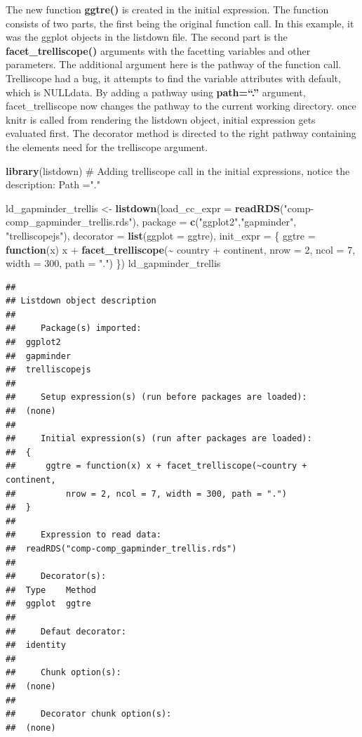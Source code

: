 \documentclass[
]{article}
\newenvironment{Shaded}{\begin{snugshade}}{\end{snugshade}}
\newcommand{\CommentTok}[1]{\textcolor[rgb]{0.54,0.53,0.53}{#1}}
\newcommand{\ControlFlowTok}[1]{\textcolor[rgb]{0.12,0.11,0.11}{\textbf{#1}}}
\newcommand{\DataTypeTok}[1]{\textcolor[rgb]{0.00,0.34,0.68}{#1}}
\newcommand{\DecValTok}[1]{\textcolor[rgb]{0.69,0.50,0.00}{#1}}
\newcommand{\KeywordTok}[1]{\textcolor[rgb]{0.12,0.11,0.11}{\textbf{#1}}}
\newcommand{\NormalTok}[1]{\textcolor[rgb]{0.12,0.11,0.11}{#1}}
\newcommand{\OperatorTok}[1]{\textcolor[rgb]{0.12,0.11,0.11}{#1}}
\newcommand{\StringTok}[1]{\textcolor[rgb]{0.75,0.01,0.01}{#1}}
\begin{document}
The new function \textbf{ggtre()} is created in the initial expression.
The function consists of two parts, the first being the original
function call. In this example, it was the ggplot objects in the
listdown file. The second part is the \textbf{facet\_trelliscope()}
arguments with the facetting variables and other parameters. The
additional argument here is the pathway of the function call.
Trelliscope had a bug, it attempts to find the variable attributes with
default, which is NULLdata. By adding a pathway using
\textbf{path=``.''} argument, facet\_trelliscope now changes the pathway
to the current working directory. once knitr is called from rendering
the listdown object, initial expression gets evaluated first. The
decorator method is directed to the right pathway containing the
elements need for the trelliscope argument.

\begin{Shaded}
\begin{Highlighting}[]
\KeywordTok{library}\NormalTok{(listdown)}
\CommentTok{\# Adding trelliscope call in the initial expressions, notice the description: Path ="."}

\NormalTok{ld\_gapminder\_trellis \textless{}{-}}
\StringTok{  }\KeywordTok{listdown}\NormalTok{(}\DataTypeTok{load\_cc\_expr =} \KeywordTok{readRDS}\NormalTok{(}\StringTok{"comp{-}comp\_gapminder\_trellis.rds"}\NormalTok{),}
                \DataTypeTok{package =} \KeywordTok{c}\NormalTok{(}\StringTok{"ggplot2"}\NormalTok{,}\StringTok{"gapminder"}\NormalTok{, }\StringTok{"trelliscopejs"}\NormalTok{),}
              \DataTypeTok{decorator =} \KeywordTok{list}\NormalTok{(}\DataTypeTok{ggplot =}\NormalTok{ ggtre), }
              \DataTypeTok{init\_expr =}\NormalTok{ \{}
\NormalTok{                  ggtre =}\StringTok{ }\ControlFlowTok{function}\NormalTok{(x) x }\OperatorTok{+}
\StringTok{                          }\KeywordTok{facet\_trelliscope}\NormalTok{(}\OperatorTok{\textasciitilde{}}\StringTok{ }\NormalTok{country }\OperatorTok{+}\StringTok{ }\NormalTok{continent,}
                                            \DataTypeTok{nrow =} \DecValTok{2}\NormalTok{, }\DataTypeTok{ncol =} \DecValTok{7}\NormalTok{, }\DataTypeTok{width =} \DecValTok{300}\NormalTok{, }\DataTypeTok{path =} \StringTok{"."}\NormalTok{)}
\NormalTok{                          \})}
\NormalTok{ld\_gapminder\_trellis}
\end{Highlighting}
\end{Shaded}

\begin{verbatim}
## 
## Listdown object description
## 
##     Package(s) imported:
##  ggplot2
##  gapminder
##  trelliscopejs
## 
##     Setup expression(s) (run before packages are loaded):
##  (none)
## 
##     Initial expression(s) (run after packages are loaded):
##  {
##      ggtre = function(x) x + facet_trelliscope(~country + continent, 
##          nrow = 2, ncol = 7, width = 300, path = ".")
##  }
## 
##     Expression to read data:
##  readRDS("comp-comp_gapminder_trellis.rds")
## 
##     Decorator(s):
##  Type    Method
##  ggplot  ggtre
## 
##     Defaut decorator:
##  identity
## 
##     Chunk option(s):
##  (none)
## 
##     Decorator chunk option(s):
##  (none)
\end{verbatim}
\end{document}
